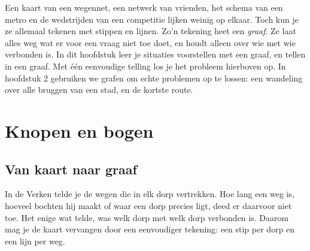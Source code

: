 Een kaart van een wegennet, een netwerk van vrienden, het schema van een metro en de wedstrijden van een competitie lijken weinig op elkaar. Toch kun je ze allemaal tekenen met stippen en lijnen. Zo'n tekening heet een \emph{graaf}. Ze laat alles weg wat er voor een vraag niet toe doet, en houdt alleen over wie met wie verbonden is. In dit hoofdstuk leer je situaties voorstellen met een graaf, en tellen in een graaf. Met één eenvoudige telling los je het probleem hierboven op. In hoofdstuk 2 gebruiken we grafen om echte problemen op te lossen: een wandeling over alle bruggen van een stad, en de kortste route.

\begin{oefeningen}[Start]

\end{oefeningen}

\section{Knopen en bogen}

\subsection{Van kaart naar graaf}

In de Verken telde je de wegen die in elk dorp vertrekken. Hoe lang een weg is, hoeveel bochten hij maakt of waar een dorp precies ligt, deed er daarvoor niet toe. Het enige wat telde, was welk dorp met welk dorp verbonden is. Daarom mag je de kaart vervangen door een eenvoudiger tekening: een stip per dorp en een lijn per weg.


